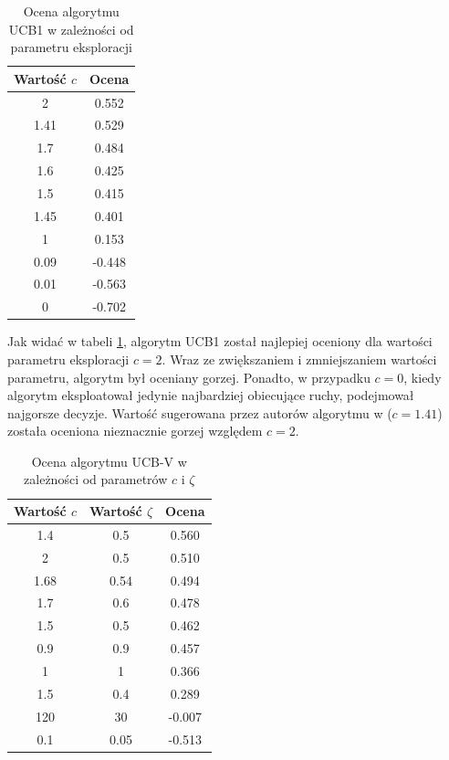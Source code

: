 \documentclass[a4paper,12pt]{article}
\begin{document}
\begin{table}[!h]
	\centering
	\begin{tabular}{|c|c|} \hline
		Wartość $c$ & Ocena \\ \hline
		2 &	0.552 \\ \hline
		\rowcolor{teal} 1.41 &	0.529 \\ \hline
		1.7 &	0.484 \\ \hline
		1.6 &	0.425 \\ \hline
		1.5 &	0.415 \\ \hline
		1.45 &	0.401 \\ \hline
		1 &	0.153 \\ \hline
		0.09 &	-0.448 \\ \hline
		0.01 &	-0.563 \\ \hline
		0 & -0.702 \\ \hline
	\end{tabular}
	\caption{Ocena algorytmu UCB1 w zależności od parametru eksploracji}
	\label{tab:ucb1_param}
\end{table}

Jak widać w tabeli \ref{tab:ucb1_param}, algorytm UCB1 został najlepiej oceniony dla wartości parametru eksploracji $c=2$. Wraz ze zwiększaniem i zmniejszaniem wartości parametru, algorytm był oceniany gorzej. Ponadto, w przypadku $c=0$, kiedy algorytm eksploatował jedynie najbardziej obiecujące ruchy, podejmował najgorsze decyzje. Wartość sugerowana przez autorów algorytmu w \cite{banditbased} ($c=1.41$) została oceniona nieznacznie gorzej względem $c=2$.

\clearpage

\begin{table}[!h]
	\centering
	\begin{tabular}{|c|c|c|} \hline
		Wartość $c$ & Wartość $\zeta$ & Ocena \\ \hline
		1.4 & 0.5 & 	0.560 \\ \hline
		2 & 0.5 & 	0.510 \\ \hline
		\rowcolor{teal} 1.68 & 0.54 & 	0.494 \\ \hline
		1.7 & 0.6 & 	0.478 \\ \hline
		1.5 & 0.5 & 	0.462 \\ \hline
		0.9 & 0.9 & 	0.457 \\ \hline
		\rowcolor{teal} 1 & 1 & 	0.366 \\ \hline
		1.5 & 0.4 & 	0.289 \\ \hline
		120 & 30 & 	-0.007 \\ \hline
		0.1 & 0.05 & 	-0.513 \\ \hline
	\end{tabular}
	\caption{Ocena algorytmu UCB-V w zależności od parametrów $c$ i $\zeta$}
	\label{tab:ucbv_param}
\end{table}
\end{document}
